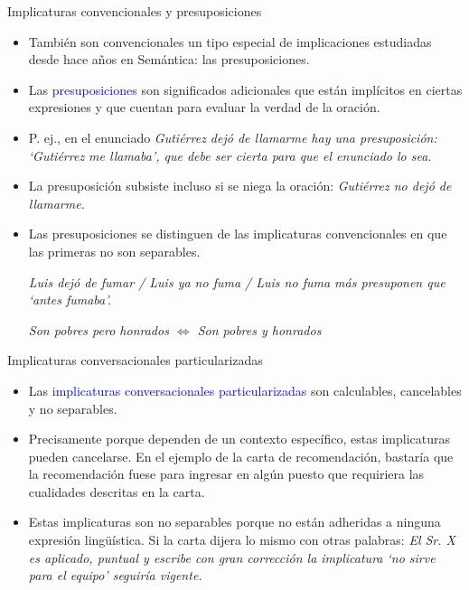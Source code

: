 \documentclass{beamer}
\begin{document}
\begin{frame}{Implicaturas convencionales y presuposiciones}

	\begin{itemize}
		\item También son convencionales un tipo especial de implicaciones estudiadas desde hace años en Semántica: las presuposiciones.
		\item Las \textcolor{blue}{presuposiciones} son significados adicionales que están implícitos en ciertas expresiones y que cuentan para evaluar la verdad de la oración.
		\item P. ej., en el enunciado \it{Gutiérrez dejó de llamarme} hay una presuposición: `Gutiérrez me llamaba', que debe ser cierta para que el enunciado lo sea.
		\item La presuposición subsiste incluso si se niega la oración: \it{Gutiérrez no dejó de llamarme}.
		\item Las presuposiciones se distinguen de las implicaturas convencionales en que las primeras no son separables. 
		
		\it{Luis dejó de fumar} / \it{Luis ya no fuma} / \it{Luis no fuma más} presuponen que `antes fumaba'.
		
		\it{Son pobres pero honrados} $\iff$ \it{Son pobres y honrados} 		
	\end{itemize}

\end{frame}

\begin{frame}{Implicaturas conversacionales particularizadas}

	\begin{itemize}
		\item Las \textcolor{blue}{implicaturas conversacionales particularizadas} son calculables, cancelables y no separables.
		\item Precisamente porque dependen de un contexto específico, estas implicaturas pueden cancelarse. En el ejemplo de la carta de recomendación, bastaría que la recomendación fuese para ingresar en algún puesto que requiriera las cualidades descritas en la carta.
		\item Estas implicaturas son no separables porque no están adheridas a ninguna expresión lingüística. Si la carta dijera lo mismo con otras palabras: \it{El Sr. X es aplicado, puntual y escribe con gran corrección} la implicatura `no sirve para el equipo' seguiría vigente.
	\end{itemize}

\end{frame}
\end{document}
